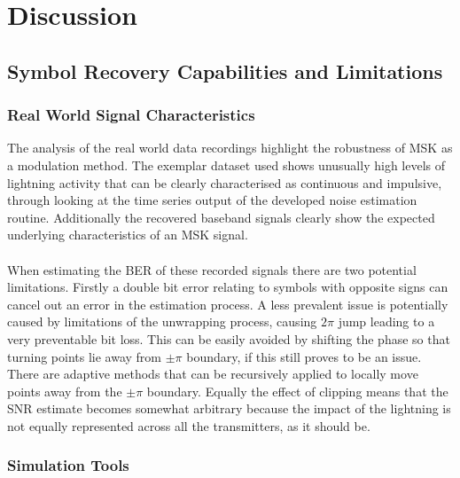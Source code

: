 \chapter{Discussion}

\section{Symbol Recovery Capabilities and Limitations}
\subsection{Real World Signal Characteristics}
The analysis of the real world data recordings highlight the robustness of MSK as a modulation method. The exemplar dataset used shows unusually high levels of lightning activity that can be clearly characterised as continuous and impulsive, through looking at the time series output of the developed noise estimation routine. Additionally the recovered baseband signals clearly show the expected underlying characteristics of an MSK signal.  
\\\\
When estimating the BER of these recorded signals there are two potential limitations. Firstly a double bit error relating to symbols with opposite signs can cancel out an error in the estimation process. A less prevalent issue is potentially caused by limitations of the unwrapping process, causing $2\pi$ jump leading to a very preventable bit loss. This can be easily avoided by shifting the phase so that turning points lie away from $\pm\pi$ boundary, if this still proves to be an issue. There are adaptive methods that can be recursively applied to locally move points away from the $\pm\pi$ boundary. Equally the effect of clipping means that the SNR estimate becomes somewhat arbitrary because the impact of the lightning is not equally represented across all the transmitters, as it should be.

\subsection{Simulation Tools}

